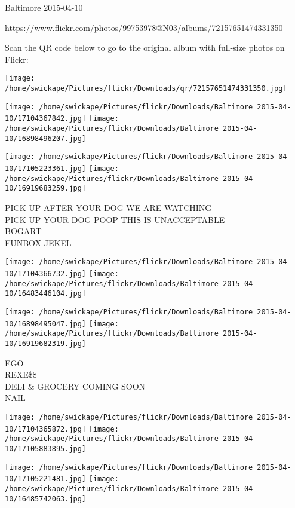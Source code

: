 \documentclass[10pt,letterpaper]{article}
\begin{document}
Baltimore 2015-04-10

https://www.flickr.com/photos/99753978@N03/albums/72157651474331350

Scan the QR code below to go to the original album with full-size photos on Flickr:

\texttt{[image: /home/swickape/Pictures/flickr/Downloads/qr/72157651474331350.jpg]}
\pagebreak

\texttt{[image: /home/swickape/Pictures/flickr/Downloads/Baltimore 2015-04-10/17104367842.jpg]}
\texttt{[image: /home/swickape/Pictures/flickr/Downloads/Baltimore 2015-04-10/16898496207.jpg]}

\texttt{[image: /home/swickape/Pictures/flickr/Downloads/Baltimore 2015-04-10/17105223361.jpg]}
\texttt{[image: /home/swickape/Pictures/flickr/Downloads/Baltimore 2015-04-10/16919683259.jpg]}

PICK UP AFTER YOUR DOG WE ARE WATCHING\\
PICK UP YOUR DOG POOP THIS IS UNACCEPTABLE\\
BOGART\\
FUNBOX JEKEL\\
\pagebreak

\texttt{[image: /home/swickape/Pictures/flickr/Downloads/Baltimore 2015-04-10/17104366732.jpg]}
\texttt{[image: /home/swickape/Pictures/flickr/Downloads/Baltimore 2015-04-10/16483446104.jpg]}

\texttt{[image: /home/swickape/Pictures/flickr/Downloads/Baltimore 2015-04-10/16898495047.jpg]}
\texttt{[image: /home/swickape/Pictures/flickr/Downloads/Baltimore 2015-04-10/16919682319.jpg]}

EGO\\
REXE\$\$\\
DELI \& GROCERY COMING SOON\\
NAIL\\
\pagebreak

\texttt{[image: /home/swickape/Pictures/flickr/Downloads/Baltimore 2015-04-10/17104365872.jpg]}
\texttt{[image: /home/swickape/Pictures/flickr/Downloads/Baltimore 2015-04-10/17105883895.jpg]}

\texttt{[image: /home/swickape/Pictures/flickr/Downloads/Baltimore 2015-04-10/17105221481.jpg]}
\texttt{[image: /home/swickape/Pictures/flickr/Downloads/Baltimore 2015-04-10/16485742063.jpg]}
\end{document}
